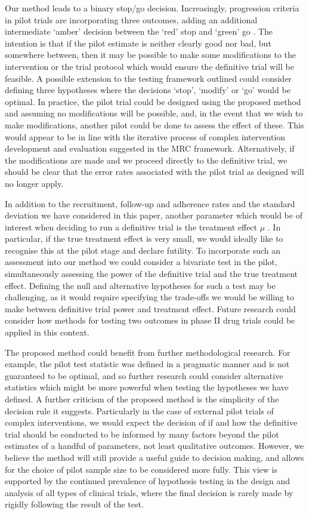 \documentclass{article}
\begin{document}
Our method leads to a binary stop/go decision. Increasingly, progression criteria in pilot trials are incorporating three outcomes, adding an additional intermediate `amber' decision between the `red' stop and `green' go \cite{Avery2017}. The intention is that if the pilot estimate is neither clearly good nor bad, but somewhere between, then it may be possible to make some modifications to the intervention or the trial protocol which would ensure the definitive trial will be feasible. A possible extension to the testing framework outlined could consider defining three hypotheses where the decisions `stop', `modify' or `go' would be optimal. In practice, the pilot trial could be designed using the proposed method and assuming no modifications will be possible, and, in the event that we wish to make modifications, another pilot could be done to assess the effect of these. This would appear to be in line with the iterative process of complex intervention development and evaluation suggested in the MRC framework\cite{Craig2008}. Alternatively, if the modifications are made and we proceed directly to the definitive trial, we should be clear that the error rates associated with the pilot trial as designed will no longer apply.

In addition to the recruitment, follow-up and adherence rates and the standard deviation we have considered in this paper, another parameter which would be of interest when deciding to run a definitive trial is the treatment effect $\mu$ \cite{Wilson2015}. In particular, if the true treatment effect is very small, we would ideally like to recognise this at the pilot stage and declare futility. To incorporate such an assessment into our method we could consider a bivariate test in the pilot, simultaneously assessing the power of the definitive trial and the true treatment effect. Defining the null and alternative hypotheses for such a test may be challenging, as it would require specifying the trade-offs we would be willing to make between definitive trial power and treatment effect. Future research could consider how methods for testing two outcomes in phase II drug trials\cite{Conaway1996, Thall2008} could be applied in this context.

The proposed method could benefit from further methodological research. For example, the pilot test statistic was defined in a pragmatic manner and is not guaranteed to be optimal, and so further research could consider alternative statistics which might be more powerful when testing the hypotheses we have defined. A further criticism of the proposed method is the simplicity of the decision rule it suggests. Particularly in the case of external pilot trials of complex interventions, we would expect the decision of if and how the definitive trial should be conducted to be informed by many factors beyond the pilot estimates of a handful of parameters, not least qualitative outcomes. However, we believe the method will still provide a useful guide to decision making, and allows for the choice of pilot sample size to be considered more fully. This view is supported by the continued prevalence of hypothesis testing in the design and analysis of all types of clinical trials, where the final decision is rarely made by rigidly following the result of the test. 
\end{document}
